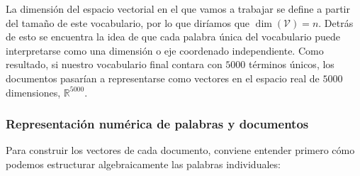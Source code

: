 \documentclass[12pt,a4paper]{article}
\begin{document}
La dimensión del espacio vectorial en el que vamos a trabajar se define a partir del tamaño de este vocabulario, por lo que diríamos que $\dim(\mathcal{V}) = n$. Detrás de esto se encuentra la idea de que cada palabra única del vocabulario puede interpretarse como una dimensión o eje coordenado independiente. Como resultado, si nuestro vocabulario final contara con $5000$ términos únicos, los documentos pasarían a representarse como vectores en el espacio real de $5000$ dimensiones, $\mathbb{R}^{5000}$.

\subsubsection{Representación numérica de palabras y documentos}

Para construir los vectores de cada documento, conviene entender primero cómo podemos estructurar algebraicamente las palabras individuales:
\end{document}

